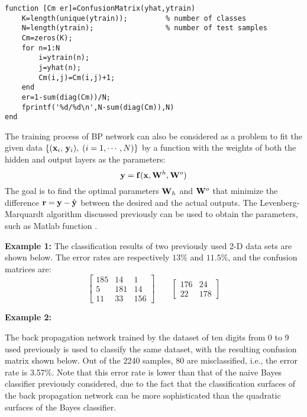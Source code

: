 \documentclass{article}
\begin{document}
\begin{verbatim}
function [Cm er]=ConfusionMatrix(yhat,ytrain)
    K=length(unique(ytrain));         % number of classes
    N=length(ytrain);                 % number of test samples
    Cm=zeros(K);
    for n=1:N
        i=ytrain(n);
        j=yhat(n);
        Cm(i,j)=Cm(i,j)+1;                
    end
    er=1-sum(diag(Cm))/N;
    fprintf('%d/%d\n',N-sum(diag(Cm)),N)
end
\end{verbatim}


The training process of BP network can also be considered as a 
 problem to fit
the given data $\{({\bf x}_i,\,{\bf y}_i),\;(i=1,\cdots,N)\}$ by a
function with the weights of both the hidden and output layers as the
parameters:
\begin{equation}
  {\bf y}={\bf f}({\bf x},{\bf W}^h,{\bf W}^o) 
\end{equation}
The goal is to find the optimal parameters ${\bf W}_h$ and ${\bf W}^o$
that minimize the difference ${\bf r}={\bf y}-\hat{\bf y}$ between the 
desired and the actual outputs. The Levenberg-Marquardt algorithm discussed
previously can be used to obtain the parameters, such as Matlab function
.

{\bf Example 1:} The classification results of two previously used 2-D 
data sets are shown below. The error rates are respectively $13\%$ and 
$11.5\%$, and the confusion matrices are:
\begin{equation}
\left[ \begin{array}{rrr}
    185 & 14 &  1 \\  5 & 181 & 14 \\ 11 & 33 &156 
  \end{array}\right]
\;\;\;\;\;\;\;
\left[ \begin{array}{rr}176 & 24 \\ 22 & 178 \end{array}\right]
\end{equation}


{\bf Example 2:}

The back propagation network trained by the dataset of ten digits from 
0 to 9 used previously is used to classify the same dataset, with the
resulting confusion matrix shown below. Out of the 2240 samples, 80 are
misclassified, i.e., the error rate is 3.57\%. Note that this error 
rate is lower than that of the naive Bayes classifier previously 
considered, due to the fact that the classification surfaces of the
back propagation network can be more sophisticated than the quadratic
surfaces of the Bayes classifier.
\end{document}

